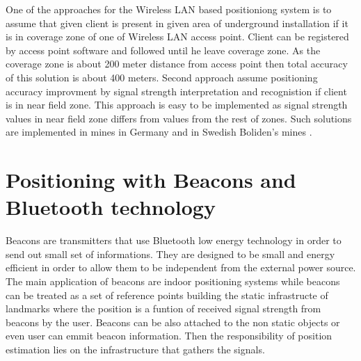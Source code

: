 \documentclass[../main.tex]{subfiles}
\begin{document}
One of the approaches for the Wireless LAN based positioniong system is to assume that given client is present in given area of underground installation if it is in coverage zone of one of Wireless LAN access point. Client can be registered by access point software and followed until he leave coverage zone. As the coverage zone is about 200 meter distance from access point then total accuracy of this solution is about 400 meters. Second approach assume positioning accuracy improvment by signal strength interpretation and recognistion if client is in near field zone. This approach is easy to be implemented as signal strength values in near field zone differs from values from the rest of zones. Such solutions are implemented in mines in Germany \cite{Thesis_CM} and in Swedish Boliden's mines \cite{thesis_tablet_positioning}.





\section{Positioning with Beacons and Bluetooth technology} %
\label{sec:positioning_with_beacons_and_bluetooth_technology}

Beacons are transmitters that use Bluetooth low energy technology in order to send out small set of informations. They are designed to be small and energy efficient in order to allow them to be independent from the external power source. The main application of beacons are indoor positioning systems while beacons can be treated as a set of reference points building the static infrastructe of landmarks where the position is a funtion of received signal strength from beacons by the user. Beacons can be also attached to the non static objects or even user can emmit beacon information. Then the responsibility of position estimation lies on the infrastructure that gathers the signals.
\end{document}

